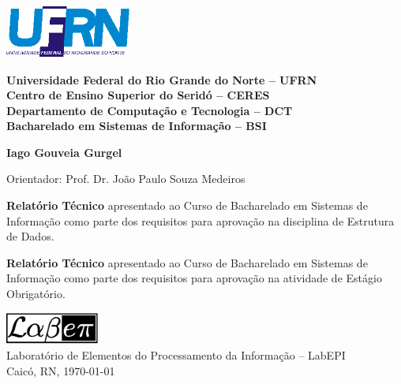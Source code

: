 \begin{titlepage}

\begin{center}

\small

\parbox{0.33\textwidth}{%
\includegraphics[width=0.31\textwidth]{image/ufrn.eps}}%
\parbox{0.67\textwidth}{%
\begin{center}%
\textbf{%
Universidade Federal do Rio Grande do Norte -- UFRN\\
Centro de Ensino Superior do Seridó -- CERES\\
Departamento de Computação e Tecnologia -- DCT\\
Bacharelado em Sistemas de Informação -- BSI}
\end{center}}

\vfill

\LARGE

\textbf{\titulo}

\vfill

\Large

\textbf{Iago Gouveia Gurgel}

\vfill

\normalsize

Orientador: Prof. Dr. João Paulo Souza Medeiros

\vfill

\hfill
\if\doctype\doctypem           %
\parbox{0.5\linewidth}{%
{\bf Relatório Técnico} apresentado ao Curso de Bacharelado em Sistemas de
Informação como parte dos requisitos para aprovação na disciplina de
Estrutura de Dados.}
\fi
\if\doctype\doctyper           %
\parbox{0.5\linewidth}{%
{\bf Relatório Técnico} apresentado ao Curso de Bacharelado em Sistemas de
Informação como parte dos requisitos para aprovação na atividade de Estágio
Obrigatório.}
\fi

\vfill

\large

\includegraphics[width=0.23\textwidth]{image/labepi.eps} \\
Laboratório de Elementos do Processamento da Informação -- LabEPI \\
Caicó, RN, \today

\end{center}

\end{titlepage}
